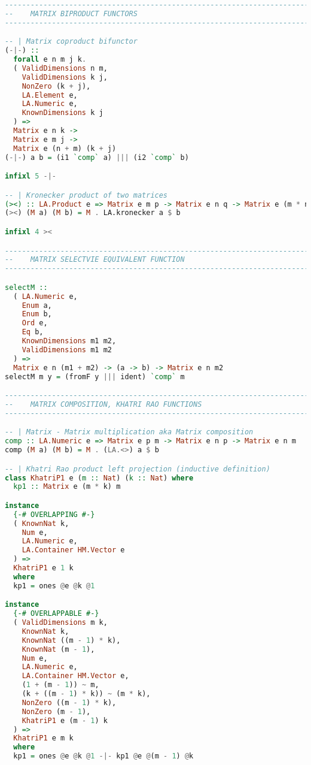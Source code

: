 \documentclass[
  oneside,
  11pt, a4paper,
  footinclude=true,
  headinclude=true,
  cleardoublepage=empty
]{scrbook}
\theoremstyle{definition}
\theoremstyle{definition}
\begin{document}
\begin{lstlisting}[language=Haskell, caption={Matrix.Internal},captionpos=b]
-------------------------------------------------------------------------------
--    MATRIX BIPRODUCT FUNCTORS
-------------------------------------------------------------------------------

-- | Matrix coproduct bifunctor
(-|-) ::
  forall e n m j k.
  ( ValidDimensions n m,
    ValidDimensions k j,
    NonZero (k + j),
    LA.Element e,
    LA.Numeric e,
    KnownDimensions k j
  ) =>
  Matrix e n k ->
  Matrix e m j ->
  Matrix e (n + m) (k + j)
(-|-) a b = (i1 `comp` a) ||| (i2 `comp` b)

infixl 5 -|-

-- | Kronecker product of two matrices
(><) :: LA.Product e => Matrix e m p -> Matrix e n q -> Matrix e (m * n) (p * q)
(><) (M a) (M b) = M . LA.kronecker a $ b

infixl 4 ><

-------------------------------------------------------------------------------
--    MATRIX SELECTVIE EQUIVALENT FUNCTION
-------------------------------------------------------------------------------

selectM ::
  ( LA.Numeric e,
    Enum a,
    Enum b,
    Ord e,
    Eq b,
    KnownDimensions m1 m2,
    ValidDimensions m1 m2
  ) =>
  Matrix e n (m1 + m2) -> (a -> b) -> Matrix e n m2
selectM m y = (fromF y ||| ident) `comp` m

-------------------------------------------------------------------------------
--    MATRIX COMPOSITION, KHATRI RAO FUNCTIONS
-------------------------------------------------------------------------------

-- | Matrix - Matrix multiplication aka Matrix composition
comp :: LA.Numeric e => Matrix e p m -> Matrix e n p -> Matrix e n m
comp (M a) (M b) = M . (LA.<>) a $ b

-- | Khatri Rao product left projection (inductive definition)
class KhatriP1 e (m :: Nat) (k :: Nat) where
  kp1 :: Matrix e (m * k) m

instance
  {-# OVERLAPPING #-}
  ( KnownNat k,
    Num e,
    LA.Numeric e,
    LA.Container HM.Vector e
  ) =>
  KhatriP1 e 1 k
  where
  kp1 = ones @e @k @1

instance
  {-# OVERLAPPABLE #-}
  ( ValidDimensions m k,
    KnownNat k,
    KnownNat ((m - 1) * k),
    KnownNat (m - 1),
    Num e,
    LA.Numeric e,
    LA.Container HM.Vector e,
    (1 + (m - 1)) ~ m,
    (k + ((m - 1) * k)) ~ (m * k),
    NonZero ((m - 1) * k),
    NonZero (m - 1),
    KhatriP1 e (m - 1) k
  ) =>
  KhatriP1 e m k
  where
  kp1 = ones @e @k @1 -|- kp1 @e @(m - 1) @k


\end{lstlisting}
\end{document}
